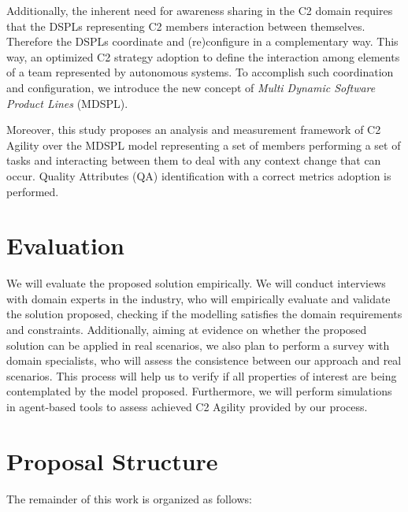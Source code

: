 Additionally, the inherent need for awareness sharing in the C2 domain requires that the DSPLs representing C2 members  interaction between themselves. Therefore the DSPLs coordinate and (re)configure in a complementary way. This way, an optimized C2 strategy adoption to define the interaction among elements of a team represented by autonomous systems. To accomplish such coordination and configuration, we introduce the new concept of \textit{Multi Dynamic Software Product Lines} (MDSPL).

Moreover, this study proposes an analysis and measurement framework of C2 Agility over the MDSPL model representing a set of members performing a set of tasks and interacting between them to deal with any context change that can occur. Quality Attributes (QA) identification with a correct metrics adoption is performed.

\section{Evaluation} \label{sec:evalIntro}

We will evaluate the proposed solution empirically. We will conduct interviews with domain experts in the industry, who will  empirically evaluate and validate the solution proposed, checking if the modelling satisfies the domain requirements and constraints. Additionally, aiming at evidence on whether the proposed solution can be applied in real scenarios, we also plan to perform a survey with domain specialists, who will assess the consistence between our approach and real scenarios. This process will help us to verify if all properties of interest are being contemplated by the model proposed. Furthermore, we will perform simulations in agent-based tools to assess achieved C2 Agility provided by our process. 


\section{Proposal Structure} \label{sec:structureWork}

The remainder of this work is organized as follows:

